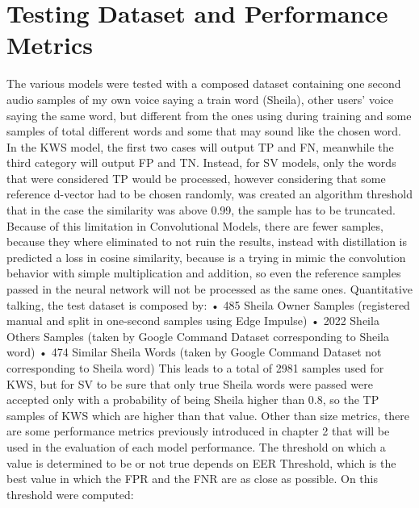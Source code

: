 \section{Testing Dataset and Performance Metrics}
\label{sec:testing dataset and performance metrics}
The various models were tested with a composed dataset containing one second audio samples of my own voice saying a train word (Sheila), other users' voice saying the same word, but different from the ones using during training\cite{librispeech} and some samples of total different words and some that may sound like the chosen word. In the KWS model, the first two cases will output TP and FN, meanwhile the third category will output FP and TN. Instead, for SV models, only the words that were considered TP would be processed, however considering that some reference d-vector had to be chosen randomly, was created an algorithm threshold that in the case the similarity was above 0.99, the sample has to be truncated. Because of this limitation in Convolutional Models, there are fewer samples, because they where eliminated to not ruin the results, instead with distillation is predicted a loss in cosine similarity, because is a trying in mimic the convolution behavior with simple multiplication and addition, so even the reference samples passed in the neural network will not be processed as the same ones.\newline\newline
Quantitative talking, the test dataset is composed by:\newline
• 485 Sheila Owner Samples (registered manual and split in one-second samples using Edge Impulse\cite{syntiant_tutorial_edgeimpulse})\newline
• 2022 Sheila Others Samples (taken by Google Command Dataset\cite{speechcommands} corresponding to Sheila word)\newline
• 474 Similar Sheila Words (taken by Google Command Dataset\cite{speechcommands} not corresponding to Sheila word)\newline
This leads to a total of 2981 samples used for KWS, but for SV to be sure that only true Sheila words were passed were accepted only with a probability of being Sheila higher than 0.8, so the TP samples of KWS which are higher than that value.\newline\newline
Other than size metrics, there are some performance metrics previously introduced in chapter 2 that will be used in the evaluation of each model performance. The threshold on which a value is determined to be or not true depends on EER Threshold, which is the best value in which the FPR and the FNR are as close as possible. On this threshold were computed:\newline
